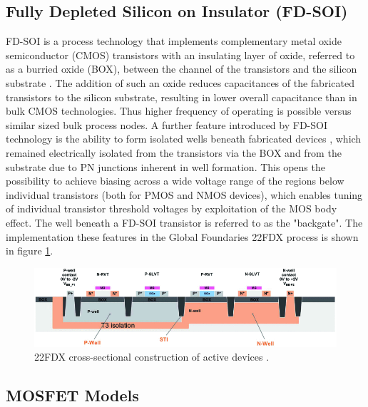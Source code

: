 	\subsection{Fully Depleted Silicon on Insulator (FD-SOI)}
	FD-SOI is a process technology that implements complementary metal oxide semiconductor (CMOS) transistors with an insulating layer of oxide, referred to as a burried oxide (BOX), between the channel of the transistors and the silicon substrate \cite{Planes2012}. The addition of such an oxide reduces capacitances of the fabricated transistors to the silicon substrate, resulting in lower overall capacitance than in bulk CMOS technologies. Thus higher frequency of operating is possible versus similar sized bulk process nodes. A further feature introduced by FD-SOI technology is the ability to form isolated wells beneath fabricated devices \cite{Wiatr2019}, which remained electrically isolated from the transistors via the BOX and from the substrate due to PN junctions inherent in well formation. This opens the possibility to achieve biasing across a wide voltage range of the regions below individual transistors (both for PMOS and NMOS devices), which enables tuning of individual transistor threshold voltages by exploitation of the MOS body effect. The well beneath a FD-SOI transistor is referred to as the "backgate". The implementation these features in the Global Foundaries 22FDX process is shown in figure \ref{fig:22fdx_wells}. 
	
			\begin{figure}[htb!]
			        \centering
			        \includegraphics[width=1\textwidth, angle=0]{./figs/theory/wiatr1-p4-wiatr-large}
			    \caption{22FDX cross-sectional construction of active devices \cite{Wiatr2019}.}
			    \label{fig:22fdx_wells}
			\end{figure}
	
	\subsection{MOSFET Models}


